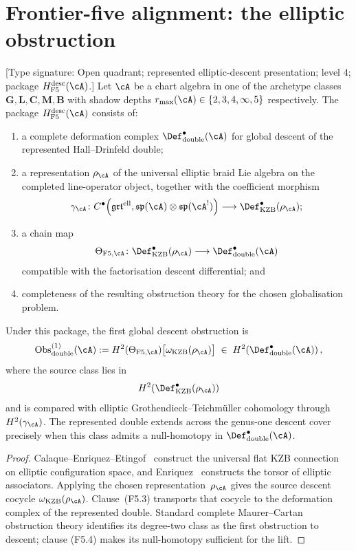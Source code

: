 \section{Frontier-five alignment: the elliptic obstruction}
\label{sec:level-4-f5-alignment}

\begin{theorem}
\label{thm:level-4-F5-obstruction}
\ClaimStatusConditional
\textup{[Type signature: Open quadrant; represented elliptic-descent
presentation; level $4$; package $H_{\mathrm{F5}}^{\mathrm{desc}}(\cA)$.]}
Let $\cA$ be a chart algebra in one of the archetype classes
$\mathbf{G}, \mathbf{L}, \mathbf{C}, \mathbf{M}, \mathbf{B}$ with
shadow depths
$\rmax(\cA)\in\{2,3,4,\infty,5\}$ respectively.  The package
$H_{\mathrm{F5}}^{\mathrm{desc}}(\cA)$ consists of:
\begin{enumerate}[label=\textup{(F5.\arabic*)}]
\item a complete deformation complex
$\Def_{\mathrm{double}}^\bullet(\cA)$ for global descent of the
represented Hall--Drinfeld double;
\item a representation $\rho_\cA$ of the universal elliptic braid Lie
algebra on the completed line-operator object, together with the
coefficient morphism
\[
 \gamma_\cA\colon
 C^\bullet\!\left(\grtell,
 \sptt(\cA)\otimes\sptt(\cA^!)\right)
 \longrightarrow \Def_{\mathrm{KZB}}^\bullet(\rho_\cA);
\]
\item a chain map
\[
 \Theta_{\mathrm{F5},\cA}\colon
 \Def_{\mathrm{KZB}}^\bullet(\rho_\cA)
 \longrightarrow \Def_{\mathrm{double}}^\bullet(\cA)
\]
compatible with the factorisation descent differential; and
\item completeness of the resulting obstruction theory for the chosen
globalisation problem.
\end{enumerate}
Under this package, the first global descent obstruction is
\[
\operatorname{Obs}^{(1)}_{\mathrm{double}}(\cA)
:=
H^2(\Theta_{\mathrm{F5},\cA})
\bigl[\omega_{\mathrm{KZB}}(\rho_\cA)\bigr]
\;\in\;
H^2\!\left(\Def_{\mathrm{double}}^\bullet(\cA)\right),
\]
where the source class lies in
\[
H^2\!\left(\Def_{\mathrm{KZB}}^\bullet(\rho_\cA)\right)
\]
and is compared with elliptic Grothendieck--Teichm\"uller cohomology
through~$H^2(\gamma_\cA)$.
The represented double extends across the genus-one descent cover
precisely when this class admits a null-homotopy in
$\Def_{\mathrm{double}}^\bullet(\cA)$.
\end{theorem}

\begin{proof}
Calaque--Enriquez--Etingof~\cite{CEE09} construct the universal flat
KZB connection on elliptic configuration space, and
Enriquez~\cite{Enriquez14} constructs the torsor of elliptic
associators.  Applying the chosen representation~$\rho_\cA$ gives the
source descent cocycle
$\omega_{\mathrm{KZB}}(\rho_\cA)$.  Clause~\textup{(F5.3)} transports
that cocycle to the deformation complex of the represented double.
Standard complete Maurer--Cartan obstruction theory identifies its
degree-two class as the first obstruction to descent; clause
\textup{(F5.4)} makes its null-homotopy sufficient for the lift.
\end{proof}

